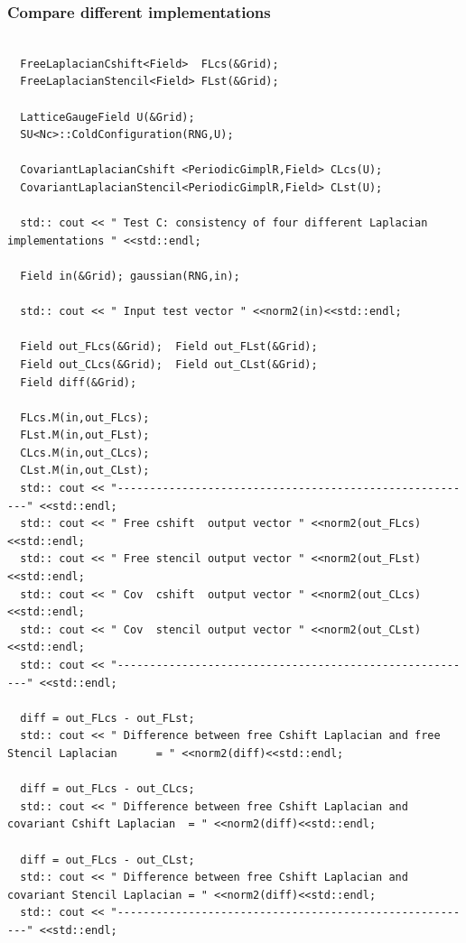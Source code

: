 \documentclass[pdf,ps,8pt]{beamer}
\newcommand{\miniscule}{\fontsize{3pt}{4pt}\selectfont}
\begin{document}
  \begin{frame}[fragile]\small\frametitle{ Compare different implementations}

{\miniscule
  \begin{verbatim}

  FreeLaplacianCshift<Field>  FLcs(&Grid);
  FreeLaplacianStencil<Field> FLst(&Grid);

  LatticeGaugeField U(&Grid);
  SU<Nc>::ColdConfiguration(RNG,U);

  CovariantLaplacianCshift <PeriodicGimplR,Field> CLcs(U);
  CovariantLaplacianStencil<PeriodicGimplR,Field> CLst(U);

  std:: cout << " Test C: consistency of four different Laplacian implementations " <<std::endl;

  Field in(&Grid); gaussian(RNG,in);

  std:: cout << " Input test vector " <<norm2(in)<<std::endl;

  Field out_FLcs(&Grid);  Field out_FLst(&Grid);
  Field out_CLcs(&Grid);  Field out_CLst(&Grid);
  Field diff(&Grid);

  FLcs.M(in,out_FLcs);  
  FLst.M(in,out_FLst);
  CLcs.M(in,out_CLcs);
  CLst.M(in,out_CLst);
  std:: cout << "--------------------------------------------------------" <<std::endl;
  std:: cout << " Free cshift  output vector " <<norm2(out_FLcs)<<std::endl;
  std:: cout << " Free stencil output vector " <<norm2(out_FLst)<<std::endl;
  std:: cout << " Cov  cshift  output vector " <<norm2(out_CLcs)<<std::endl;
  std:: cout << " Cov  stencil output vector " <<norm2(out_CLst)<<std::endl;
  std:: cout << "--------------------------------------------------------" <<std::endl;

  diff = out_FLcs - out_FLst;
  std:: cout << " Difference between free Cshift Laplacian and free Stencil Laplacian      = " <<norm2(diff)<<std::endl;

  diff = out_FLcs - out_CLcs;
  std:: cout << " Difference between free Cshift Laplacian and covariant Cshift Laplacian  = " <<norm2(diff)<<std::endl;

  diff = out_FLcs - out_CLst;
  std:: cout << " Difference between free Cshift Laplacian and covariant Stencil Laplacian = " <<norm2(diff)<<std::endl;
  std:: cout << "--------------------------------------------------------" <<std::endl;

  \end{verbatim}
}
  \end{frame}
\end{document}

